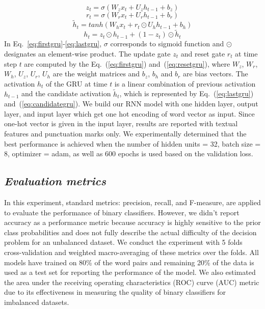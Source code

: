 \documentclass{amia}
\begin{document}
\begin{equation}
z_t = \sigma(W_zx_t + U_zh_{t-1} + b_z)
\label{eq:firstgru}
\end{equation}
\begin{equation}
r_t = \sigma(W_rx_t + U_rh_{t-1} + b_r)
\label{eq:resetgru}
\end{equation}
\begin{equation}
\tilde h_t = tanh(W_hx_t + r_t \odot U_hh_{t-1} + b_h) 
\label{eq:candidategru}
\end{equation}
\begin{equation}
h_t = z_t \odot h_{t-1} + (1-z_t) \odot \tilde h_t
\label{eq:lastgru}
\end{equation}  
In Eq.~\ref{eq:firstgru}-\ref{eq:lastgru}, $\sigma$ corresponds to sigmoid function and $\odot$ designates an element-wise product. The update gate $z_t$ and reset gate $r_t$ at time step $t$ are computed by the Eq.~(\ref{eq:firstgru}) and~(\ref{eq:resetgru}), where $W_z$, $W_r$, $W_h$, $U_z$, $U_r$, $U_h$ are the weight matrices and $b_z$, $b_h$ and $b_r$ are bias vectors. The activation $h_t$ of the GRU at time $t$ is a linear combination of previous activation $h_{t-1}$ and the candidate activation $\tilde h_t$, which is represented by Eq.~(\ref{eq:lastgru}) and~(\ref{eq:candidategru}). We build our RNN model with one hidden layer, output layer, and input layer which get one hot encoding of word vector as input. Since one-hot vector is given in the input layer, results are reported with textual features and punctuation marks only. We experimentally determined that the best performance is achieved when the number of hidden units = 32, batch size = 8, optimizer = adam, as well as 600 epochs is used based on the validation loss.         
  
\subsection*{\textit{Evaluation metrics}}
In this experiment, standard metrics: precision, recall, and F-measure, are applied to evaluate the performance of binary classifiers\cite{aas1999text}. However, we didn't report accuracy as a performance metric because accuracy is highly sensitive to the prior class probabilities and does not fully describe the actual difficulty of the decision problem for an unbalanced dataset. We conduct the experiment with 5 folds cross-validation and weighted macro-averaging of these metrics over the folds. All models have trained on 80\% of the word pairs and remaining 20\% of the data is used as a test set for reporting the performance of the model. We also estimated the area under the receiving operating characteristics (ROC) curve\cite{kumar2011receiver} (AUC) metric due to its effectiveness in measuring the quality of binary classifiers for imbalanced datasets\cite{hu2015kernelized}. 
\end{document}
